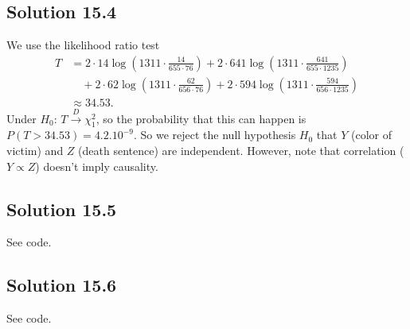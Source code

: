 \subsection*{Solution 15.4}

We use the likelihood ratio test
\begin{equation*}
    \begin{split}
        T &= 2 \cdot 14 \log\left(1311 \cdot \frac{14}{655 \cdot 76} \right)
            + 2 \cdot 641 \log\left(1311 \cdot \frac{641}{655 \cdot 1235} \right) \\
            &\quad + 2 \cdot 62 \log\left(1311 \cdot \frac{62}{656 \cdot 76} \right)
            + 2 \cdot 594 \log\left(1311 \cdot \frac{594}{656 \cdot 1235} \right) \\
        &\approx 34.53.
    \end{split}
\end{equation*}
Under $H_0$: $T \xrightarrow{D} \chi^2_1$, so the probability that this can happen is $P(T > 34.53) = 4.2.10^{-9}$.
So we reject the null hypothesis $H_0$ that $Y$ (color of victim) and $Z$ (death sentence) are independent.
However, note that correlation ($Y \propto Z$) doesn't imply causality.


\subsection*{Solution 15.5}

See code.


\subsection*{Solution 15.6}

See code.
